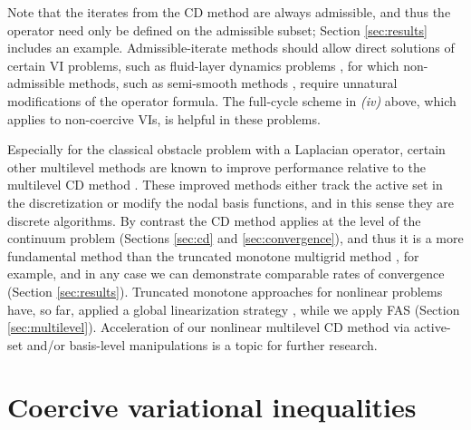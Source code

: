 \documentclass[letterpaper,final,12pt,reqno]{amsart}
\theoremstyle{cstyle}
\theoremstyle{cstyle*}
\theoremstyle{dstyle}
\numberwithin{equation}{section}
\numberwithin{figure}{section}
\numberwithin{table}{section}
\numberwithin{theorem}{section}
\begin{document}
Note that the iterates from the CD method are always admissible, and thus the operator need only be defined on the admissible subset; Section \ref{sec:results} includes an example.  Admissible-iterate methods should allow direct solutions of certain VI problems, such as fluid-layer dynamics problems \cite{Bueler2021conservation,JouvetBueler2012}, for which non-admissible methods, such as semi-smooth methods \cite{BensonMunson2006}, require unnatural modifications of the operator formula.  The full-cycle scheme in \emph{(iv)} above, which applies to non-coercive VIs, is helpful in these problems.

Especially for the classical obstacle problem with a Laplacian operator, certain other multilevel methods are known to improve performance relative to the multilevel CD method \cite{GraeserKornhuber2009}.  These improved methods either track the active set in the discretization or modify the nodal basis functions, and in this sense they are discrete algorithms.  By contrast the CD method applies at the level of the continuum problem (Sections \ref{sec:cd} and \ref{sec:convergence}), and thus it is a more fundamental method than the truncated monotone multigrid method \cite{Kornhuber1994}, for example, and in any case we can demonstrate comparable rates of convergence (Section \ref{sec:results}). %
Truncated monotone approaches for nonlinear problems have, so far, applied a global linearization strategy \cite{GraeserKornhuber2009}, while we apply FAS (Section \ref{sec:multilevel}).  Acceleration of our nonlinear multilevel CD method via active-set and/or basis-level manipulations is a topic for further research.



\section{Coercive variational inequalities} \label{sec:vi}
\end{document}

